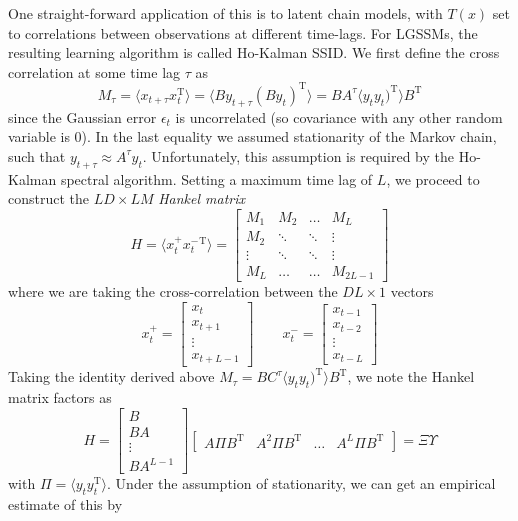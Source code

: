 \documentclass[a4paper]{article}
\begin{document}
One straight-forward application of this is to latent chain models, with $T(x)$ set to correlations between observations at different time-lags. For LGSSMs, the resulting learning algorithm is called Ho-Kalman SSID. We first define the cross correlation at some time lag $\tau$ as
\[ M_\tau = \langle x_{t+\tau}x_t^\textrm{T} \rangle = \langle By_{t+\tau}(By_t)^\textrm{T} \rangle  = BA^\tau \langle y_ty_t)^\textrm{T} \rangle B^\textrm{T} \]
since the Gaussian error $\epsilon_t$ is uncorrelated (so covariance with any other random variable is 0). In the last equality we assumed stationarity of the Markov chain, such that $y_{t+\tau} \approx A^\tau y_t$. Unfortunately, this assumption is required by the Ho-Kalman spectral algorithm. Setting a maximum time lag of $L$, we proceed to construct the $LD\times LM$ \emph{Hankel matrix}
\[
H = \langle x_t^+{x_t^-}^\textrm{T} \rangle = 
\begin{bmatrix} M_1 & M_2 & \ldots & M_L \\ 
M_2 & \ddots & \ddots & \vdots \\ 
\vdots & \ddots & \ddots & \vdots \\
M_L & \ldots & \ldots & M_{2L-1}
\end{bmatrix} 
\]
where we are taking the cross-correlation between the $DL \times 1$ vectors
\[ x_t^+ = \begin{bmatrix} x_t \\ x_{t+1} \\ \vdots \\ x_{t+L-1} \end{bmatrix} \quad\quad x_t^- = \begin{bmatrix} x_{t-1} \\ x_{t-2} \\ \vdots \\ x_{t-L} \end{bmatrix} \]
Taking the identity derived above $M_\tau = BC^\tau \langle y_ty_t)^\textrm{T} \rangle B^\textrm{T}$, we note the Hankel matrix factors as
\[ H = \begin{bmatrix} B \\ BA \\ \vdots \\ BA^{L-1} \end{bmatrix} \begin{bmatrix} A\Pi B^\textrm{T} & A^2\Pi B^\textrm{T} & \ldots & A^L\Pi B^\textrm{T} \end{bmatrix} = \Xi \Upsilon \]
with $\Pi = \langle y_ty_t^\textrm{T}\rangle$. Under the assumption of stationarity, we can get an empirical estimate of this by
\end{document}
